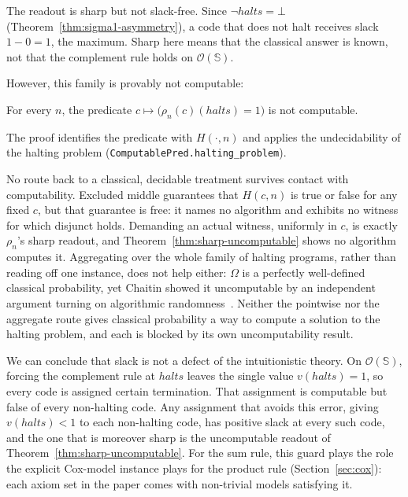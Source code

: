 \noindent
The readout is sharp but not slack-free. Since
$\neg\mathit{halts} = \bot$ (Theorem~\ref{thm:sigma1-asymmetry}), a
code that does not halt receives slack $1 - 0 = 1$, the maximum. Sharp
here means that the classical answer is known, not that the
complement rule holds on $\mathcal{O}(\mathbb{S})$.

\noindent
However, this family is provably not computable:

\begin{theorem}
\label{thm:sharp-uncomputable}
For every $n$, the predicate $c \mapsto \bigl(\rho_n(c)(\mathit{halts}) = 1\bigr)$
is not computable.
\end{theorem}

\noindent
The proof identifies the predicate with $H(\cdot, n)$ and applies the
undecidability of the halting problem
(\texttt{ComputablePred.\allowbreak halting\_problem}).

\noindent
No route back to a classical, decidable treatment survives contact
with computability. Excluded middle guarantees that $H(c,n)$ is true
or false for any fixed $c$, but that guarantee is free: it names no
algorithm and exhibits no witness for which disjunct holds. Demanding
an actual witness, uniformly in $c$, is exactly $\rho_n$'s sharp
readout, and Theorem~\ref{thm:sharp-uncomputable} shows no algorithm
computes it. Aggregating over the whole family of halting programs,
rather than reading off one instance, does not help either:
$\Omega$ is a perfectly well-defined classical probability, yet
Chaitin showed it uncomputable by an independent argument turning on
algorithmic randomness~\cite{chaitin1975}. Neither the pointwise nor
the aggregate route gives classical probability a way to compute a
solution to the halting problem, and each is blocked by its own
uncomputability result.

\noindent
We can conclude that slack is not a defect of
the intuitionistic theory. On $\mathcal{O}(\mathbb{S})$, forcing the
complement rule at $\mathit{halts}$ leaves the single value
$v(\mathit{halts}) = 1$, so every code is assigned certain
termination. That assignment is computable but false of every
non-halting code. Any assignment that avoids this error, giving
$v(\mathit{halts}) < 1$ to each non-halting code, has positive slack
at every such code, and the one that is moreover sharp is the
uncomputable readout of Theorem~\ref{thm:sharp-uncomputable}.
For the sum rule, this guard plays the role the
explicit Cox-model instance plays for the product rule
(Section~\ref{sec:cox}): each axiom set in the paper comes with 
non-trivial models satisfying it.
